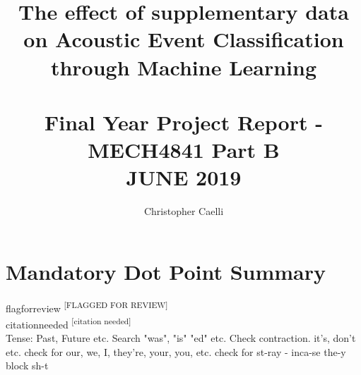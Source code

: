 \documentclass{UoNMCHA}
\newcommand{\citationneeded}{\textsuperscript{\color{blue} [citation needed]}}
\newcommand{\flagforreview}{\textsuperscript{\color{red} [FLAGGED FOR REVIEW]}}
\numberwithin{equation}{section}
\begin{document}
\title{The effect of supplementary data on Acoustic Event Classification through Machine Learning \\ \ \\
{\small Final Year Project Report - MECH4841 Part B  \\JUNE 2019}}
\author[UoNMCHA]{Christopher Caelli}
\address[UoNMCHA]{
Student of Mechatronics Engineering,\\
The University of Newcastle, Callaghan, NSW 2308, AUSTRALIA \\
E-mail: \href{mailto:Christopher.Caelli@uon.edu.au}{\textsf{Christopher.Caelli@uon.edu.au}}}
\maketitle
\onecolumn

\vspace{-5mm}
\section*{Mandatory Dot Point Summary}
\vspace{-3mm}

flagforreview \flagforreview \\
citationneeded \citationneeded \\
Tense: Past, Future etc. Search "was", "is" "ed" etc.
Check contraction. it's, don't etc.
check for our, we, I, they're, your, you, etc.
check for st-ray - inca-se the-y block sh-t
\end{document}
